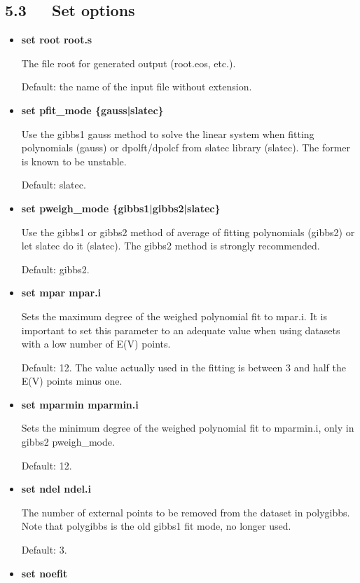 \documentclass[a4paper]{article}
\begin{document}
\subsection{5.3   Set options%
  \label{set-options}%
}

\begin{itemize}
\item \textbf{set root root.s}

The file root for generated output (root.eos, etc.).

Default: the name of the input file without extension.

\item \textbf{set pfit\_mode \{gauss|slatec\}}

Use the gibbs1 gauss method to solve the linear system when fitting
polynomials (gauss) or dpolft/dpolcf from slatec library
(slatec). The former is known to be unstable.

Default: slatec.

\item \textbf{set pweigh\_mode \{gibbs1|gibbs2|slatec\}}

Use the gibbs1 or gibbs2 method of average of fitting polynomials
(gibbs2) or let slatec do it (slatec). The gibbs2 method is strongly
recommended.

Default: gibbs2.

\item \textbf{set mpar mpar.i}

Sets the maximum degree of the weighed polynomial fit to mpar.i. It
is important to set this parameter to an adequate value when using
datasets with a low number of E(V) points.

Default: 12. The value actually used in the fitting is between 3 and
half the E(V) points minus one.

\item \textbf{set mparmin mparmin.i}

Sets the minimum degree of the weighed polynomial fit to mparmin.i,
only in gibbs2 pweigh\_mode.

Default: 12.

\item \textbf{set ndel ndel.i}

The number of external points to be removed from the dataset in
polygibbs. Note that polygibbs is the old gibbs1 fit mode, no longer
used.

Default: 3.

\item \textbf{set noefit}


\end{itemize}
\end{document}

